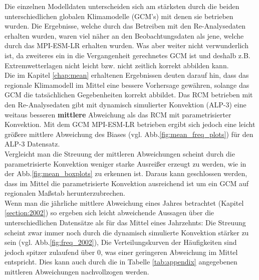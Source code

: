 Die einzelnen Modelldaten unterscheiden sich am stärksten durch die beiden unterschiedlichen globalen Klimamodelle (GCM's) mit denen sie betrieben wurden. Die Ergebnisse, welche durch das Betreiben mit den Re-Analysedaten erhalten wurden, waren viel näher an den Beobachtungsdaten als jene, welche durch das MPI-ESM-LR erhalten wurden. Was aber weiter nicht verwunderlich ist, da zweiteres ein in die Vergangenheit gerechnetes GCM ist und deshalb z.B. Extremwetterlagen nicht leicht bzw. nicht zeitlich korrekt abbilden kann.\vspace{1pt}\\

Die im Kapitel \ref{chap:mean} erhaltenen Ergebnissen deuten darauf hin, dass das regionale Klimamodell im Mittel eine bessere Vorhersage gewähren, solange das GCM die tatsächlichen Gegebenheiten korrekt abbildet. Das RCM betrieben mit den Re-Analysedaten gibt mit dynamisch simulierter Konvektion (ALP-3) eine weitaus besseren \textbf{mittlere} Abweichung als das RCM mit parametrisierter Konvektion. Mit dem GCM MPI-ESM-LR betrieben ergibt sich jedoch eine leicht größere mittlere Abweichung des Biases (vgl. Abb.\ref{fig:mean_freq_plots}) für den ALP-3 Datensatz.\\
Vergleicht man die Streuung der mittleren Abweichungen scheint durch die parametrisierte Konvektion weniger starke Ausreißer erzeugt zu werden, wie in der Abb.\ref{fig:mean_boxplots} zu erkennen ist. Daraus kann geschlossen werden, dass im Mittel die parametrisierte Konvektion ausreichend ist um ein GCM auf regionalen Maßstab herunterzubrechen.\vspace{1pt}\\

Wenn man die jährliche mittlere Abweichung eines Jahres betrachtet (Kapitel \ref{section:2002}) so ergeben sich leicht abweichende Aussagen über die unterschiedlichen Datensätze als für das Mittel eines Jahrzehnts: Die Streuung scheint zwar immer noch durch die dynamisch simulierte Konvektion stärker zu sein (vgl. Abb.\ref{fig:freq_2002}), Die Verteilungskurven der Häufigkeiten sind jedoch spitzer zulaufend über 0, was einer geringeren Abweichung im Mittel entspricht. Dies kann auch durch die in Tabelle \ref{tab:appendix} angegebenen mittleren Abweichungen nachvollzogen werden.\vspace{1pt}\\

